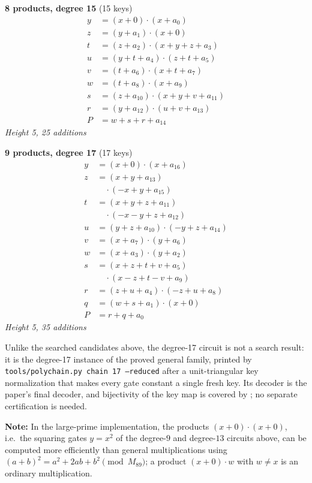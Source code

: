 \medskip
\noindent
\begin{minipage}[t]{0.47\textwidth}
\textbf{8 products, degree 15} (15 keys)
\[
\begin{aligned}
y &= (x + 0) \cdot (x + a_0) \\
z &= (y + a_1) \cdot (x + 0) \\
t &= (z + a_2) \cdot (x + y + z + a_3) \\
u &= (y + t + a_4) \cdot (z + t + a_5) \\
v &= (t + a_6) \cdot (x + t + a_7) \\
w &= (t + a_8) \cdot (x + a_9) \\
s &= (z + a_{10}) \cdot (x + y + v + a_{11}) \\
r &= (y + a_{12}) \cdot (u + v + a_{13}) \\
P &= w + s + r + a_{14}
\end{aligned}
\]
\emph{Height 5, 25 additions}
\end{minipage}
\hfill
\begin{minipage}[t]{0.47\textwidth}
\textbf{9 products, degree 17} (17 keys)
\[
\begin{aligned}
y &= (x + 0) \cdot (x + a_{16}) \\
z &= (x + y + a_{13}) \\
  &\quad\cdot(-x + y + a_{15}) \\
t &= (x + y + z + a_{11}) \\
  &\quad\cdot(-x - y + z + a_{12}) \\
u &= (y + z + a_{10}) \cdot (-y + z + a_{14}) \\
v &= (x + a_{7}) \cdot (y + a_{6}) \\
w &= (x + a_{3}) \cdot (y + a_{2}) \\
s &= (x + z + t + v + a_{5}) \\
  &\quad\cdot(x - z + t - v + a_{9}) \\
r &= (z + u + a_{4}) \cdot (-z + u + a_{8}) \\
q &= (w + s + a_{1}) \cdot (x + 0) \\
P &= r + q + a_{0}
\end{aligned}
\]
\emph{Height 5, 35 additions}
\end{minipage}

\smallskip
\noindent Unlike the searched candidates above, the degree-17 circuit is not a
search result: it is the degree-17 instance of the proved general family,
printed by \texttt{tools/polychain.py chain 17 --reduced} after a
unit-triangular key normalization that makes every gate constant a single
fresh key.  Its decoder is the paper's final decoder, and bijectivity of the
key map is covered by ; no separate
certification is needed.

\medskip
\noindent\textbf{Note:} In the large-prime implementation, the products
$(x+0)\cdot(x+0)$, i.e.\ the squaring gates $y=x^2$ of the degree-$9$ and
degree-$13$ circuits above, can be computed more efficiently than general
multiplications using $(a+b)^2=a^2+2ab+b^2\pmod{M_{89}}$; a product
$(x+0)\cdot w$ with $w\ne x$ is an ordinary multiplication.
